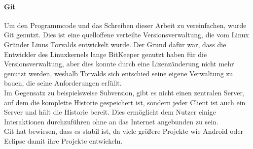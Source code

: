  \paragraph{Git}
  Um den Programmcode und das Schreiben dieser Arbeit zu vereinfachen, wurde Git genutzt. Dies ist
  eine quelloffene verteilte Versionsverwaltung, die vom Linux Gründer Linus Torvalds entwickelt
  wurde. Der Grund dafür war, dass die Entwickler des Linuxkernels lange BitKeeper genutzt haben
  für die Versionsverwaltung, aber dies konnte durch eine Lizenzänderung nicht mehr genutzt werden,
  weshalb Torvalds sich entschied seine eigene Verwaltung zu bauen, die seine Anforderungen erfüllt. \\
  Im Gegensatz zu beispielsweise Subversion, gibt es nicht einen zentralen Server, auf dem die komplette
  Historie gespeichert ist, sondern jeder Client ist auch ein Server und hält die Historie bereit. Dies
  ermöglicht dem Nutzer einige Interaktionen durchzuführen ohne an das Internet angebunden zu sein. \\
  Git hat bewiesen, dass es stabil ist, da viele größere Projekte wie Android oder Eclipse damit ihre
  Projekte entwickeln.
